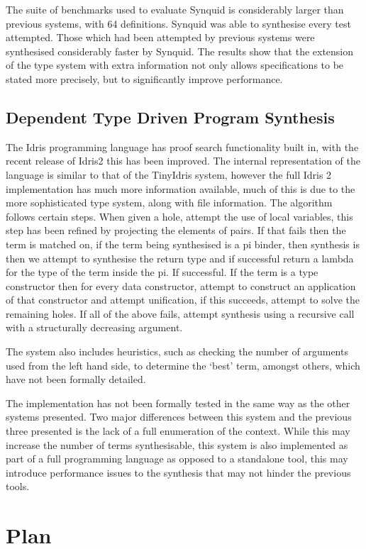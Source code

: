 \documentclass[a4paper]{article}
\begin{document}
The suite of benchmarks used to evaluate Synquid is considerably larger than previous systems, with 64 definitions.
Synquid was able to synthesise every test attempted. Those which had been attempted by previous systems were synthesised 
considerably faster by Synquid. The results show that the extension of the type system with extra information not only allows
specifications to be stated more precisely, but to significantly improve performance. 

\subsection{Dependent Type Driven Program Synthesis}
\label{sec:orge4e9320}
The Idris programming language has proof search functionality built in, with the recent release of Idris2 this has 
been improved. The internal representation of the language is similar to that of the TinyIdris system, 
however the full Idris 2 implementation has much more information available, much of this is due to the more sophisticated 
type system, along with file information. The algorithm follows certain steps. 
When given a hole, attempt the use of local variables, this step has been refined by projecting the elements of pairs.
If that fails then the term is matched on, if the term being synthesised is a pi binder, then synthesis is then we attempt 
to synthesise the return type and if successful return a lambda for the type of the term inside the pi. If successful. If the term is a type constructor then for every data
constructor, attempt to construct an application of that constructor and attempt unification, if this succeeds, attempt
to solve the remaining holes. If all of the above fails, attempt synthesis using a recursive call with a structurally 
decreasing argument. 

The system also includes heuristics, such as checking the number of arguments used from the left hand side, to determine
the `best' term, amongst others, which have not been formally detailed.

The implementation has not been formally tested in the same way as the other systems presented. Two major differences 
between this system and the previous three presented is the lack of a full enumeration of the context. While this may 
increase the number of terms synthesisable, this system is also implemented as part of a full programming language as 
opposed to a standalone tool, this may introduce performance issues to the synthesis that may not hinder the previous 
tools. 
\clearpage
\section{Plan}
\label{sec:org9581116}
\end{document}
